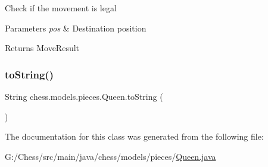Check if the movement is legal


\begin{DoxyParams}{Parameters}
{\em pos} & Destination position \\
\hline
\end{DoxyParams}
\begin{DoxyReturn}{Returns}
Move\+Result 
\end{DoxyReturn}
\mbox{\label{classchess_1_1models_1_1pieces_1_1_queen_a723a09d8252bb14578d33c099242e37d}} 
\subsubsection{\texorpdfstring{to\+String()}{toString()}}
{\footnotesize\ttfamily String chess.\+models.\+pieces.\+Queen.\+to\+String (\begin{DoxyParamCaption}{ }\end{DoxyParamCaption})}



The documentation for this class was generated from the following file\+:\begin{DoxyCompactItemize}
\item 
G\+:/\+Chess/src/main/java/chess/models/pieces/\mbox{\hyperlink{_queen_8java}{Queen.\+java}}\end{DoxyCompactItemize}
